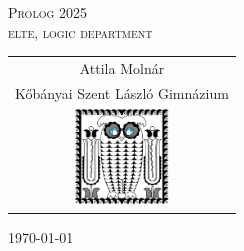 \begin{frame}
\centering
\textsc{\Large Prolog 2025 \\[1em] \textsc{elte}, logic department}

\bigskip

{ \small \begin{tabular}{c}
Attila Moln\'ar
\\Kőbányai Szent László Gimnázium
\\[3em] \includegraphics[width=2.5cm]{pseudobagoly.png}
    \end{tabular}
    }

 \begin{figure}
 \end{figure}

	\today
\end{frame}
